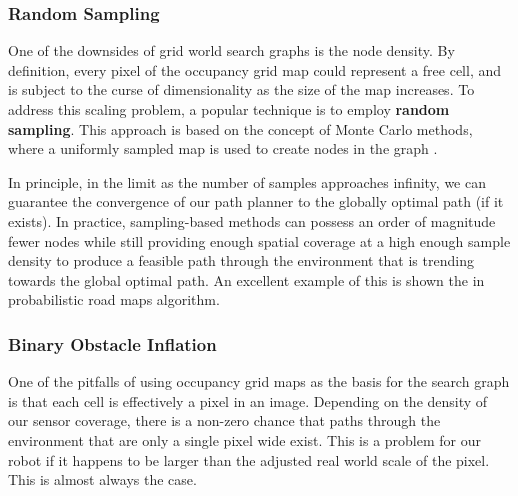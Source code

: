 \subsubsection{Random Sampling}

One of the downsides of grid world search graphs is the node density. By definition, every pixel of the occupancy grid map could represent a free cell, and is subject to the curse of dimensionality as the size of the map increases. To address this scaling problem, a popular technique is to employ \textbf{random sampling}. This approach is based on the concept of Monte Carlo methods, where a uniformly sampled map is used to create nodes in the graph \cite{montecarlo}. 

In principle, in the limit as the number of samples approaches infinity, we can guarantee the convergence of our path planner to the globally optimal path (if it exists). In practice, sampling-based methods can possess an order of magnitude fewer nodes while still providing enough spatial coverage at a high enough sample density to produce a feasible path through the environment that is trending towards the global optimal path. An excellent example of this is shown the in probabilistic road maps algorithm. 

\subsubsection{Binary Obstacle Inflation}

One of the pitfalls of using occupancy grid maps as the basis for the search graph is that each cell is effectively a pixel in an image. Depending on the density of our sensor coverage, there is a non-zero chance that paths through the environment that are only a single pixel wide exist. This is a problem for our robot if it happens to be larger than the adjusted real world scale of the pixel. This is almost always the case. 

